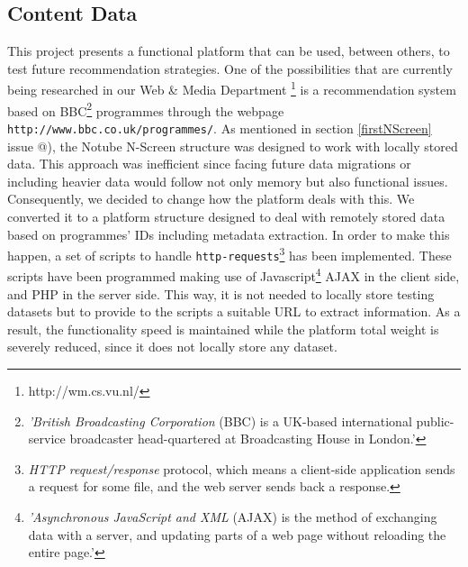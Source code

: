 \documentclass{acm_proc_article-sp}
\makeatletter
\newcommand*{\rom}[1]{\expandafter\@slowromancap\romannumeral #1@}
\makeatother
\begin{document}
\subsection{Content Data} \label{data}
This project presents a functional platform that can be used, between others, to test future recommendation strategies. One of the possibilities that are currently being researched in our Web \& Media Department \footnote{http://wm.cs.vu.nl/} is a recommendation system based on BBC\cite{wiki:bbc}\footnote{\textit{'British Broadcasting Corporation} (BBC) is a UK-based international public-service broadcaster head-quartered at Broadcasting House in London.'} programmes through the webpage \texttt{http://www.bbc.co.uk/programmes/}. As mentioned in section \ref{firstNScreen} issue \rom{5}), the Notube N-Screen structure was designed to work with locally stored data. This approach was inefficient since facing future data migrations or including heavier data would follow not only memory but also functional issues. Consequently, we decided to change how the platform deals with this. We converted it to a platform structure designed to deal with remotely stored data based on programmes' IDs including metadata extraction. In order to make this happen, a set of scripts to handle \texttt{http-requests}\footnote{ \textit{HTTP request/response} protocol, which means a client-side application sends a request for some file, and the web server sends back a response.} has been implemented. These scripts have been programmed making use of Javascript\cite{w3c:ajax}\footnote{\textit{'Asynchronous JavaScript and XML} (AJAX) is the method of exchanging data with a server, and updating parts of a web page without reloading the entire page.'} AJAX in the client side, and PHP in the server side. This way, it is not needed to locally store testing datasets but to provide to the scripts a suitable URL to extract information. As a result, the functionality speed is maintained while the platform total weight is severely reduced, since it does not locally store any dataset. 
\end{document}
